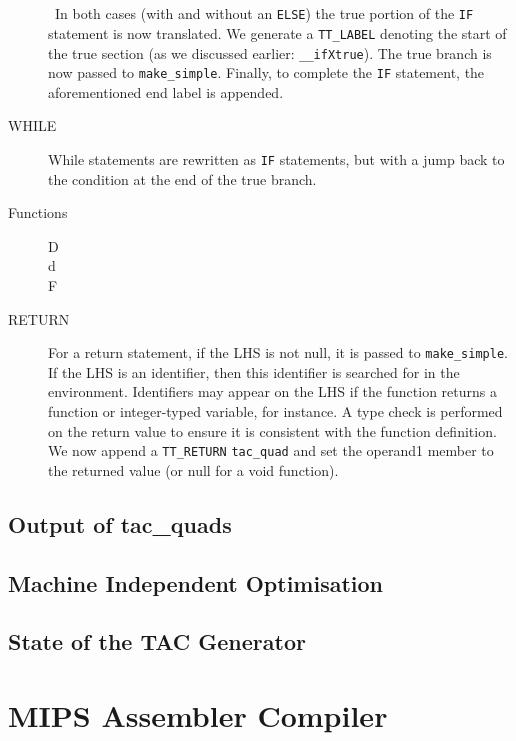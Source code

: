 \begin{description}
\\ \ \\ \
In both cases (with and without an \verb!ELSE!) the true portion of the \verb!IF! statement is now translated. We generate a \verb!TT_LABEL! denoting the start of the true section (as we discussed earlier: \verb!__ifXtrue!). The true branch is now passed to \verb!make_simple!. Finally, to complete the \verb!IF! statement, the aforementioned end label is appended.
	\item[WHILE] While statements are rewritten as \verb!IF! statements, but with a jump back to the condition at the end of the true branch.
	\item[Functions]
		\begin{description}
			\item[D]
			\item[d]
			\item[F]
		\end{description}
	\item[RETURN] For a return statement, if the LHS is not null, it is passed to \verb!make_simple!. If the LHS is an identifier, then this identifier is searched for in the environment. Identifiers may appear on the LHS if the function returns a function or integer-typed variable, for instance. A type check is performed on the return value to ensure it is consistent with the function definition. We now append a \verb!TT_RETURN! \verb!tac_quad! and set the operand1 member to the returned value (or null for a void function).
\end{description}

\subsection{Output of tac\_quads}
\subsection{Machine Independent Optimisation}
\subsection{State of the TAC Generator}

\section{MIPS Assembler Compiler}
\label{section:MIPS}